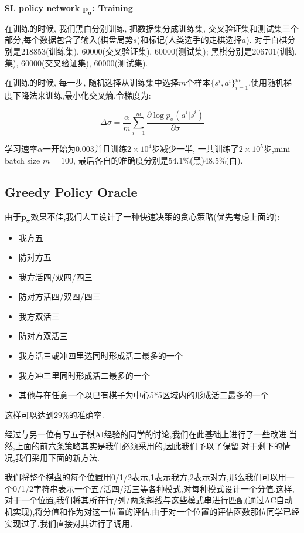 \documentclass[twocolumn]{article}
\begin{document}
\noindent \textbf{SL policy network $\bm{p_\sigma}$: Training}

在训练的时候, 我们黑白分别训练, 把数据集分成训练集, 交叉验证集和测试集三个部分,每个数据包含了输入(棋盘局势$s$)和标记(人类选手的走棋选择$a$). 对于白棋分别是218853(训练集), 60000(交叉验证集), 60000(测试集); 黑棋分别是206701(训练集), 60000(交叉验证集), 60000(测试集).

在训练的时候, 每一步, 随机选择从训练集中选择$m$个样本$\{s^i, a^i\}_{i=1}^m$,使用随机梯度下降法来训练,最小化交叉熵,令梯度为: 

\[
\Delta\sigma = \frac{\alpha}{m} \sum_{i=1}^{m} \frac{\partial\log p_\sigma(a^i|s^i)}{\partial \sigma}
\]

学习速率$\alpha$一开始为$0.003$并且训练$2 \times 10^4$步减少一半, 一共训练了$2 \times 10^5$步,mini-batch size $m = 100$, 最后各自的准确度分别是$54.1\%$(黑)$48.5\%$(白).

\subsection{Greedy Policy Oracle}

由于$\bm{p_\pi}$效果不佳,我们人工设计了一种快速决策的贪心策略(优先考虑上面的):

\begin{itemize}
\item 我方五
\item 防对方五
\item 我方活四/双四/四三
\item 防对方活四/双四/四三
\item 我方双活三
\item 防对方双活三
\item 我方活三或冲四里选同时形成活二最多的一个
\item 我方冲三里同时形成活二最多的一个
\item 其他与在任意一个以已有棋子为中心5*5区域内的形成活二最多的一个
\end{itemize}

这样可以达到$29\%$的准确率.

经过与另一位有写五子棋AI经验的同学的讨论,我们在此基础上进行了一些改进.当然,上面的前六条策略其实是我们必须采用的,因此我们予以了保留.对于剩下的情况,我们采用下面的新方法.

我们将整个棋盘的每个位置用0/1/2表示,1表示我方,2表示对方,那么我们可以用一个0/1/2字符串表示一个五/活四/活三等各种模式,对每种模式设计一个分值.这样,对于一个位置,我们将其所在行/列/两条斜线与这些模式串进行匹配(通过AC自动机实现),将分值和作为对这一位置的评估.由于对一个位置的评估函数那位同学已经实现过了,我们直接对其进行了调用.
\end{document}
